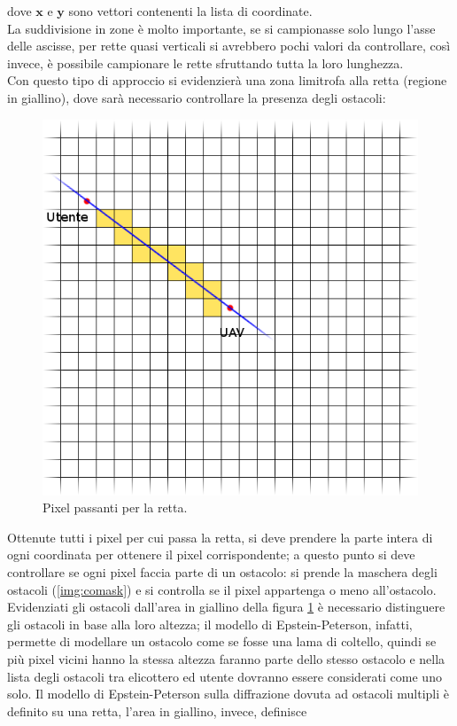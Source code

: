 dove $\textbf{x}$ e $\textbf{y}$ sono vettori contenenti la lista di coordinate. \\
La suddivisione in zone è molto importante, se si campionasse solo lungo l'asse delle ascisse, per rette quasi verticali si avrebbero 
pochi valori da controllare, così invece, è possibile campionare le rette sfruttando tutta la loro lunghezza. \\
Con questo tipo di approccio si evidenzierà una zona limitrofa alla retta (regione in giallino), dove sarà necessario controllare la 
presenza degli ostacoli:
\begin{figure}[h]
\centering
\includegraphics[height=0.7\textwidth]{Immagini/quadretti}
\caption{Pixel passanti per la retta.}
\label{img:quadretti}
\end{figure}
Ottenute tutti i pixel per cui passa la retta, si deve prendere la parte intera di ogni coordinata per ottenere il pixel 
corrispondente; a questo punto si deve controllare se ogni pixel faccia parte di un ostacolo: si prende la maschera degli ostacoli 
(\ref{img:comask}) e si controlla se il pixel appartenga o meno all'ostacolo. \\
Evidenziati gli ostacoli dall'area in giallino della figura \ref{img:quadretti} è necessario distinguere gli ostacoli in base alla loro
altezza; il modello di Epstein-Peterson, infatti, permette di modellare un ostacolo come se fosse una lama di coltello, quindi se più
pixel vicini hanno la stessa altezza faranno parte dello stesso ostacolo e nella lista degli ostacoli tra elicottero ed utente dovranno
essere considerati come uno solo.
Il modello di Epstein-Peterson sulla diffrazione dovuta ad ostacoli multipli è definito su una retta, l'area in giallino, invece, definisce
